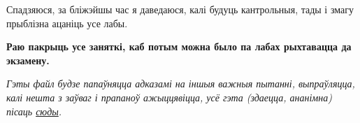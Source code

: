 \documentclass[12pt, a4paper]{extarticle}
\begin{document}
	Спадзяюся, за бліжэйшы час я даведаюся, калі будуць кантрольныя, тады і змагу прыблізна ацаніць усе лабы. 
	
	\textbf{Раю пакрыць усе заняткі, каб потым можна было па лабах рыхтавацца да экзамену.}
	
	\textit{Гэты файл будзе папаўняцца адказамі на іншыя важныя пытанні, выпраўляцца, калі нешта з заўваг і прапаноў ажыццявіцца, усё гэта (здаецца, ананімна) пісаць \href{https://docs.google.com/document/d/1La38_lqT7PtdRVmlvKIVh_7rIWvHqPBFG7yrWFoKkFM/edit?usp=sharing}{сюды}.}
\end{document}
